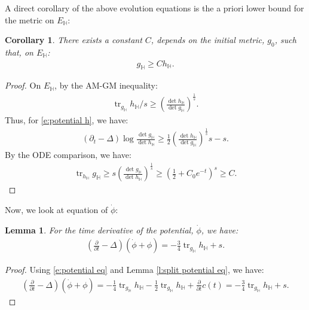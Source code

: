 \documentclass[12pt]{amsart}
\numberwithin{equation}{section}
\newtheorem{lemma}[prop]{Lemma}
\newtheorem{cor}[prop]{Corollary}
\numberwithin{prop}{section}
\theoremstyle{definition}
\begin{document}
A direct corollary of the above evolution equations is the a priori lower bound for the metric on $E_\mathbb{H}$:
\begin{cor}\label{c:lower z}
    There exists a constant $C$, depends on the initial metric, $g_0$, such that, on $E_\mathbb{H}$:
    \begin{align*}
        g_\mathbb{H}\geq C h_\mathbb{H}.
    \end{align*}
\end{cor}
\begin{proof}
    On $E_\mathbb{H}$, by the AM-GM inequality:
    \begin{align*}
        \operatorname{tr}_{g_\mathbb{H}}h_\mathbb{H}/s \geq (\frac{\operatorname{det}h_\mathbb{H}}{\operatorname{det}g_\mathbb{H}})^{\frac{1}{s}}.
    \end{align*}
    Thus, for \eqref{e:potential h}, we have:
    \begin{align*}
        (\partial_t -\Delta) \operatorname{log}\frac{\operatorname{det}g_{\mathbb{H}}}{\operatorname{det}h_{\mathbb{H}}} \geq \frac{1}{2}(\frac{\operatorname{det}h_\mathbb{H}}{\operatorname{det}g_\mathbb{H}})^{\frac{1}{s}}s -s.
    \end{align*}
    By the ODE comparison, we have:
    \begin{align*}
        \operatorname{tr}_{h_\mathbb{H}}g_\mathbb{H}\geq s (\frac{\operatorname{det}g_\mathbb{H}}{\operatorname{det}h_\mathbb{H}})^{\frac{1}{s}}\geq (\frac{1}{2} + C_0 e^{-t})^s\geq C.
    \end{align*}
\end{proof}
Now, we look at equation of $\dot{\phi}$:
\begin{lemma}
    For the time derivative of the potential, $\dot{\phi}$, we have:
    \begin{align*}
        (\frac{\partial}{\partial t} - \Delta)(\dot{\phi} + \phi) = 
        -\frac{3}{4}\operatorname{tr}_{g_\mathbb{H}}h_\mathbb{H}+s.
    \end{align*}
\end{lemma}
\begin{proof}
    Using \eqref{e:potential eq} and Lemma \ref{l:split potential eq}, we have:
    \begin{align*}
        (\frac{\partial}{\partial t} - \Delta)(\dot{\phi} + \phi) = -\frac{1}{4}\operatorname{tr}_{g_\mathbb{H}}h_\mathbb{H} - \frac{1}{2}\operatorname{tr}_{g_\mathbb{H}}h_\mathbb{H} + \frac{\partial}{\partial t}c(t) = -\frac{3}{4}\operatorname{tr}_{g_\mathbb{H}}h_\mathbb{H}+s.
    \end{align*}
\end{proof}
\end{document}

